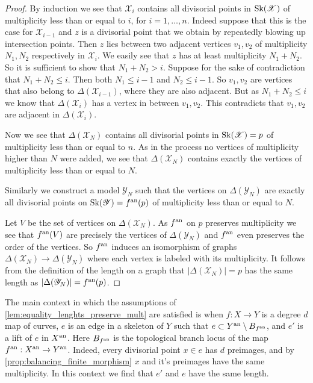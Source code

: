 \begin{proof}
	By induction we see that $\mathscr X_i$ contains all divisorial points in $\operatorname{Sk}(\mathscr X)$ of multiplicity less than or equal to $i$, for $i = 1, \ldots, n$. 
	Indeed suppose that this is the case for $\mathscr X_{i -1}$ and $z$ is a divisorial point that we obtain by repeatedly blowing up intersection points.
	Then  $z$ lies between two adjacent vertices $v_1, v_2$ of multiplicity $N_1, N_2$ respectively in $\mathscr X_{i}$. 
	We easily see that $z$ has at least multiplicity $N_1 + N_2$. 
	So it is sufficient to show that $N_1 + N_2 > i$. 
	Suppose for the sake of contradiction that $N_1 + N_2 \le i$.
	Then both $N_1 \le i -1$ and $N_2 \le i-1$. 
	So $v_1, v_2$ are vertices that also belong to $\Delta(\mathscr X_{i-1})$, where they are also adjacent. 
	But as $N_1 + N_2 \le i$ we know that $\Delta(\mathscr X_{i})$ has a vertex in between $v_1, v_2$. This contradicts that $v_1, v_2$ are adjacent in $\Delta(\mathscr X_{i})$. 

	Now we see that $\Delta(\mathscr X_N)$ contains all divisorial points in $\operatorname{Sk}(\mathscr X) = p$ of multiplicity less than or equal to $n$. 
	As in the process no vertices of multiplicity higher than $N$ were added, we see that $\Delta(\mathscr X_N)$ contains exactly the vertices of multiplicity less than or equal to $N$. 

	Similarly we construct a model $\mathscr Y_N$ such that the vertices on  $\Delta(\mathscr Y_N)$ are exactly all divisorial points on $\operatorname{Sk}(\mathscr Y) = f{}^{\text{an}}(p)$ of multiplicity less than or equal to $N$. 

	Let $V$ be the set of vertices on $\Delta(\mathscr X_N)$. 
	As $f{}^{\text{an}} $ on $p$ preserves multiplicity we see that $f{}^{\text{an}}(V)$ are precisely the vertices of $\Delta(\mathscr Y_N)$ and $f{}^{\text{an}}$ even preserves the order of the vertices. 
	So $f{}^{\text{an}}$ induces an isomorphism of graphs $\Delta(\mathscr X_N) \to \Delta(\mathscr Y_N)$ where each vertex is labeled with its multiplicity. 
	It follows from the definition of the length on a graph that $|\Delta(\mathscr X_N)| = p$ has the same length as $|\Delta(\mathscr Y_N)| = f{}^{\text{an}}(p)$. 
\end{proof}

\begin{remark}\label{rem:length_edge_skeleton_cover}
	The main context in which the assumptions of \cref{lem:equality_lenghts_preserve_mult} are satisfied is when $f:X \to Y$ is a degree $d$ map of curves, $e$ is an edge in a skeleton of $Y$ such that $e \subset Y{}^{\text{an}} \setminus B_{f{}^{\text{an}}}$, and $e'$ is a lift of $e$ in $X{}^{\text{an}}$. 
	Here $B_{f{}^{\text{an}}}$ is the topological branch locus of the map $f{}^{\text{an}}: X{}^{\text{an}} \to Y{}^{\text{an}}$.
	Indeed, every divisorial point $x \in e$ has $d$ preimages, and by \cref{prop:balancing_finite_morphism} $x$ and it's preimages have the same multiplicity. 
	In this context we find that $e'$ and $e$ have the same length. 
\end{remark}

